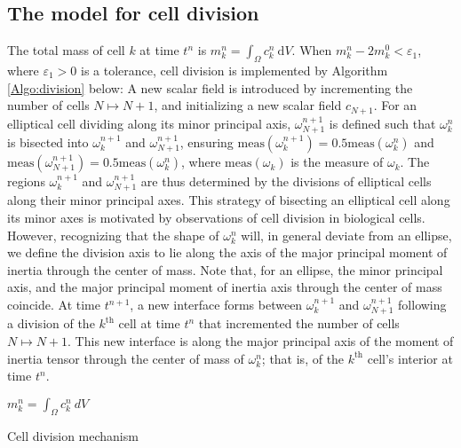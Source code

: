 \documentclass{article}
\begin{document}
\subsection{The model for cell division}
The total mass of cell $k$ at time $t^n$ is $m_k^{n} = \int_\Omega c_k^{n} ~\text{d}V$. When $m_k^n -2m_k^0 < \varepsilon_1$, where $\varepsilon_1 > 0$ is a tolerance, cell division is implemented by Algorithm \ref{Algo:division} below: A new scalar field is introduced by incrementing the number of cells $N\mapsto N+1$, and initializing a new scalar field $c_{N+1}$. For an elliptical cell dividing along its minor principal axis, $\omega_{N+1}^{n+1}$ is defined such that $\omega_k^{n}$ is bisected into $\omega_k^{n+1}$ and $\omega_{N+1}^{n+1}$, ensuring $\text{meas}(\omega_{k}^{n+1}) = 0.5\text{meas}(\omega_k^{n})$ and $\text{meas}(\omega_{N+1}^{n+1}) = 0.5\text{meas}(\omega_k^{n})$, where $\text{meas}(\omega_k)$ is the measure of $\omega_k$.
The regions $\omega_k^{n+1}$ and $\omega_{N+1}^{n+1}$ are thus determined by the divisions of elliptical cells along their minor principal axes. This strategy of bisecting an elliptical cell along its minor axes is motivated by observations of cell division in biological cells. However, recognizing that the shape of $\omega_k^n$ will, in general deviate from an ellipse, we define the division axis to lie along the axis of the major principal moment of inertia through the center of mass. Note that, for an ellipse, the minor principal axis, and the major principal moment of inertia axis through the center of mass coincide. At time $t^{n+1}$, a new interface forms between $\omega_k^{n+1}$ and $\omega_{N+1}^{n+1}$ following a division of the $k^\text{th}$ cell at time $t^n$ that incremented the number of cells $N\mapsto N+1$. This new interface is along the major principal axis of the moment of inertia tensor through the center of mass of $\omega^n_k$; that is, of the $k^\text{th}$ cell's interior at time $t^n$. 

\begin{algorithm}[h]
$m_k^{n} = \int_\Omega c_k^{n} ~dV$\;
\caption{Cell division mechanism}
\label{Algo:division}
\end{algorithm}
\end{document}
